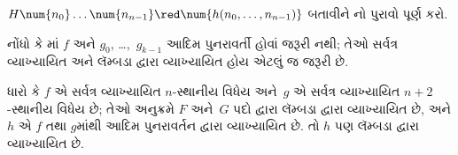 \begin{prob}
  $H\num{n_0}\dots\num{n_{n-1}} \red \num{h(n_0, \dots,
    n_{n-1})}$ બતાવીને
  નો પુરાવો પૂર્ણ કરો.
\end{prob}

નોંધો કે માં $f$ અને $g_0$,
\dots,~$g_{k-1}$ આદિમ પુનરાવર્તી હોવાં જરૂરી
નથી; તેઓ સર્વત્ર વ્યાખ્યાયિત અને લૅમ્બડા દ્વારા વ્યાખ્યાયિત
હોય એટલું જ જરૂરી છે.

\begin{lem}
  ધારો કે $f$ એ સર્વત્ર વ્યાખ્યાયિત $n$-સ્થાનીય વિધેય
  અને~$g$ એ સર્વત્ર વ્યાખ્યાયિત
  $n+2$-સ્થાનીય વિધેય છે; તેઓ અનુક્રમે
  $F$ અને~$G$ પદો દ્વારા લૅમ્બડા દ્વારા વ્યાખ્યાયિત છે,
  અને $h$ એ $f$ તથા $g$માંથી આદિમ
  પુનરાવર્તન દ્વારા વ્યાખ્યાયિત છે. તો $h$ પણ
  લૅમ્બડા દ્વારા વ્યાખ્યાયિત છે.
\end{lem}

